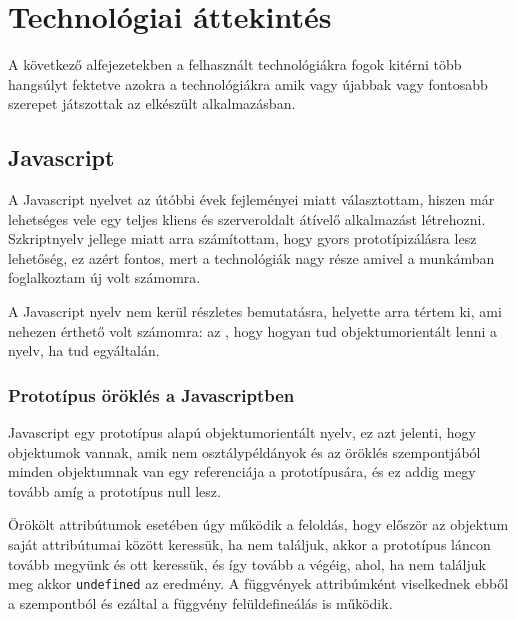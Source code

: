 



\chapter{Technológiai áttekintés}
A következő alfejezetekben a felhasznált technológiákra fogok kitérni több hangsúlyt fektetve azokra a technológiákra amik vagy újabbak vagy fontosabb szerepet játszottak az elkészült alkalmazásban.

\section{Javascript}

A Javascript nyelvet az útóbbi évek fejleményei miatt választottam, hiszen már lehetséges vele egy teljes kliens és szerveroldalt átívelő alkalmazást létrehozni. Szkriptnyelv jellege miatt arra számítottam, hogy gyors prototípizálásra lesz lehetőség, ez azért fontos, mert a technológiák nagy része amivel a munkámban foglalkoztam új volt számomra.

A Javascript nyelv nem kerül részletes bemutatásra, helyette arra tértem ki, ami nehezen érthető volt számomra: az , hogy hogyan tud objektumorientált lenni a nyelv, ha tud egyáltalán. 

\subsection{Prototípus öröklés a Javascriptben}

Javascript egy prototípus alapú objektumorientált nyelv, ez azt jelenti, hogy objektumok vannak, amik nem osztálypéldányok és az öröklés szempontjából minden objektumnak van egy referenciája a prototípusára, és ez addig megy tovább amíg a prototípus null lesz\cite{mdnprotoref}. 

Örökölt attribútumok esetében úgy működik a feloldás, hogy először az objektum saját attribútumai között keressük, ha nem találjuk, akkor a prototípus láncon tovább megyünk és ott keressük, és így tovább a végéig, ahol, ha nem találjuk meg akkor \lstinline{undefined} az eredmény. A függvények attribúmként viselkednek ebből a szempontból és ezáltal a függvény felüldefineálás is működik.

